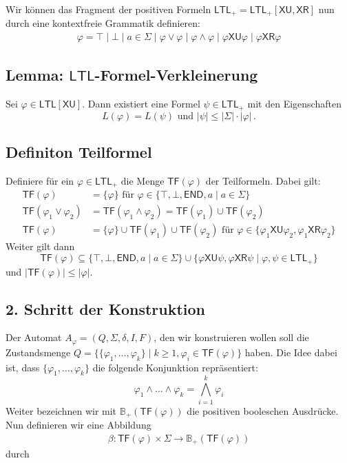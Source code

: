 \documentclass[12pt, german]{article}
\newcommand{\B}{\mathbb{B}}
\newcommand{\ltl}{\mathsf{LTL}}
\newcommand{\sX}{\mathsf{X}}
\newcommand{\sU}{\mathsf{U}}
\newcommand{\sR}{\mathsf{R}}
\newcommand{\sende}{\mathsf{END}}
\newcommand{\tf}{\mathsf{TF}}
\begin{document}
	
	
	Wir können das Fragment der positiven Formeln $\ltl_+ = \ltl_+[\sX \sU, \sX\sR]$ nun  durch eine kontextfreie Grammatik definieren: 
	\begin{align*}
		\varphi = \top \mid \bot \mid a \in \Sigma \mid \varphi \lor \varphi \mid \varphi \land \varphi \mid \varphi \sX \sU \varphi \mid \varphi \sX\sR\varphi
	\end{align*}

\subsection{Lemma: $\ltl$-Formel-Verkleinerung}
	Sei $\varphi \in \ltl[\sX\sU]$. Dann existiert eine Formel $\psi \in \ltl_+$ mit den Eigenschaften $$L(\varphi) = L(\psi) \text{ und }|\psi| \leq |\Sigma| \cdot |\varphi|\, .$$

\subsection{Definiton Teilformel}
	Definiere für ein $\varphi \in \ltl_+$ die Menge  $\tf(\varphi)$ der Teilformeln. Dabei gilt:
	\begin{align*}
		\tf(\varphi) &= \{\varphi\} \text{ für } \varphi \in \{\top, \bot, \sende, a \mid a \in \Sigma\} \\
		\tf(\varphi_1 \lor \varphi_2) &= \tf(\varphi_1 \land \varphi_2) = \tf(\varphi_1) \cup \tf(\varphi_2)\\
		 \tf(\varphi) &=\{\varphi\} \cup \tf(\varphi_1) \cup \tf(\varphi_2) \text{ für } \varphi \in \{\varphi_1 \sX\sU\varphi_2,  \varphi_1\sX\sR\varphi_2\}
	\end{align*}
	Weiter gilt dann $$\tf(\varphi) \subseteq \{\top, \bot, \sende, a \mid a \in \Sigma\} \cup \{\varphi \sX\sU\psi, \varphi\sX\sR\psi \mid \varphi, \psi \in \ltl_+\}$$ und $|\tf(\varphi)| \leq |\varphi|$.

\subsection{2. Schritt der Konstruktion}
	Der Automat $ A_\varphi =(Q, \Sigma, \delta, I, F)$, den wir konstruieren wollen soll die Zustandsmenge $Q = \{\{\varphi_1, \ldots, \varphi_k\} \mid k \geq 1, \varphi_i \in \tf(\varphi)\}$	 haben. 
	Die Idee dabei ist, dass $\{\varphi_1, \ldots, \varphi_k\}$ die folgende Konjunktion repräsentiert: $$\varphi_1 \land \ldots\land \varphi_k = \bigwedge_{i = 1}^k \varphi_i$$
	Weiter bezeichnen wir mit $\B_+(\tf(\varphi))$ die positiven booleschen Ausdrücke. Nun definieren wir eine Abbildung
	\begin{align*}
		\beta: \tf(\varphi) \times \Sigma \to \B_+(\tf(\varphi))
	\end{align*} durch
	
\end{document}
